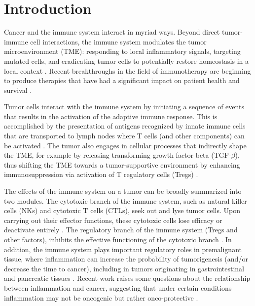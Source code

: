 \documentclass[11pt]{article}
\begin{document}
\section{Introduction}
Cancer and the immune system interact in myriad ways. Beyond direct tumor-immune cell interactions, the immune system modulates the tumor microenvironment (TME): responding to local inflammatory signals, targeting mutated cells, and eradicating tumor cells to potentially restore homeostasis in a local context \cite{de2006paradoxical}. Recent breakthroughs in the field of immunotherapy are beginning to produce therapies that have had a significant impact on patient health and survival \cite{pardoll2012blockade,restifo2012adoptive}.
\par 
Tumor cells interact with the immune system by initiating a sequence of events that results in the activation of the adaptive immune response. This is accomplished by the presentation of antigens recognized by innate immune cells that are transported to lymph nodes where T cells (and other components) can be activated \cite{schreiber11_cancer}. The tumor also engages in cellular processes that indirectly shape the TME, for example by releasing transforming growth factor beta (TGF-$\beta$), thus shifting the TME towards a tumor-supportive environment by enhancing immunosuppression via activation of T regulatory cells (Tregs) \cite{schreiber11_cancer}.
\par
The effects of the immune system on a tumor can be broadly summarized into two modules. The cytotoxic branch of the immune system, such as natural killer cells (NKs) and cytotoxic T cells (CTLs), seek out and lyse tumor cells.
Upon carrying out their effector functions, these cytotoxic cells lose efficacy or deactivate entirely \cite{finn12_immunooncology-1}.
The regulatory branch of the immune system (Tregs and other factors), inhibits the effective functioning of the cytotoxic branch \cite{ruffell2010lymphocytes}.
In addition, the immune system plays important regulatory roles in premalignant tissue, where inflammation can increase the probability of tumorigenesis (and/or decrease the time to cancer), including in tumors originating in gastrointestinal and pancreatic tissues \cite{hu10_inflammationinduced, balkwill01_inflammation}.
Recent work raises some questions about the relationship between inflammation and cancer, suggesting that under certain conditions inflammation may not be oncogenic but rather onco-protective \cite{guo17_multiscale}.
\end{document}
